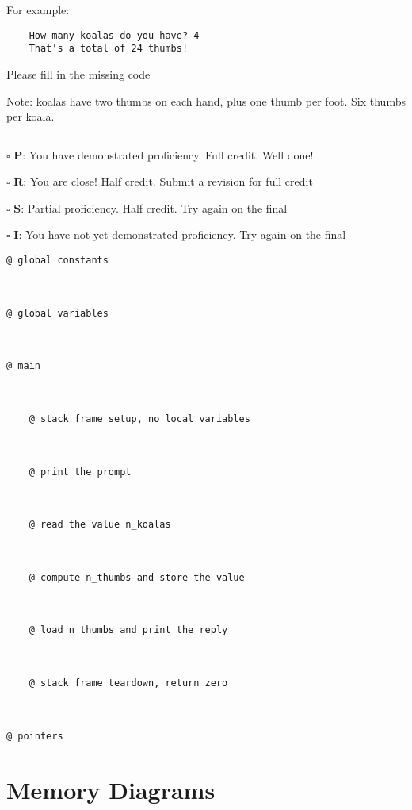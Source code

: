 \documentclass[12pt]{article}
\begin{document}
For example:
\begin{verbatim}
    How many koalas do you have? 4
    That's a total of 24 thumbs!
\end{verbatim}

Please fill in the missing code

Note: koalas have two thumbs on each hand, plus one thumb per foot. Six thumbs per koala.

\vfill

\rule[1ex]{\textwidth}{.1pt}

$\square$ \textbf{P}: You have demonstrated proficiency. Full credit. Well done!

$\square$ \textbf{R}: You are close! Half credit. Submit a revision for full credit

$\square$ \textbf{S}: Partial proficiency. Half credit. Try again on the final

$\square$ \textbf{I}: You have not yet demonstrated proficiency. Try again on the final

\newpage



\begin{verbatim}
@ global constants



@ global variables



@ main


    
    @ stack frame setup, no local variables



    @ print the prompt



    @ read the value n_koalas



    @ compute n_thumbs and store the value



    @ load n_thumbs and print the reply



    @ stack frame teardown, return zero



@ pointers
\end{verbatim}
\newpage


\section*{Memory Diagrams}

\end{document}
